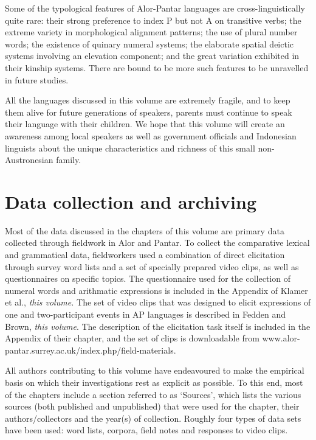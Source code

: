 Some of the typological features of Alor-Pantar languages are cross-linguistically quite rare: their strong preference to index P but not A on transitive verbs; the extreme variety in morphological alignment patterns; the use of plural number words; the existence of quinary numeral systems; the elaborate spatial deictic systems involving an elevation component; and the great variation exhibited in their kinship systems. There are bound to be more such features to be unravelled in future studies.

All the languages discussed in this volume are extremely fragile, and to keep them alive for future generations of speakers, parents must continue to speak their language with their children. We hope that this volume will create an awareness among local speakers as well as government officials and Indonesian linguists about the unique characteristics and richness of this small non-Austronesian family.

\section{Data collection and archiving}

Most of the data discussed in the chapters of this volume are primary data collected through fieldwork in Alor and Pantar. To collect the comparative lexical and grammatical data, fieldworkers used a combination of direct elicitation through survey word lists and a set of specially prepared video clips, as well as questionnaires on specific topics. The questionnaire used for the collection of numeral words and arithmatic expressions is included in the Appendix of Klamer et al., \textit{this volume.} The set of video clips that was designed to elicit expressions of one and two-participant events in AP languages is described in Fedden and Brown, \textit{this volume}. The description of the elicitation task itself is included in the Appendix of their chapter, and the set of clips is downloadable from www.alor-pantar.surrey.ac.uk/index.php/field-materials.

All authors contributing to this volume have endeavoured to make the empirical basis on which their investigations rest as explicit as possible. To this end, most of the chapters include a section referred to as `Sources', which lists the various sources (both published and unpublished) that were used for the chapter, their authors/collectors and the year(s) of collection. Roughly four types of data sets have been used: word lists, corpora, field notes and responses to video clips.


